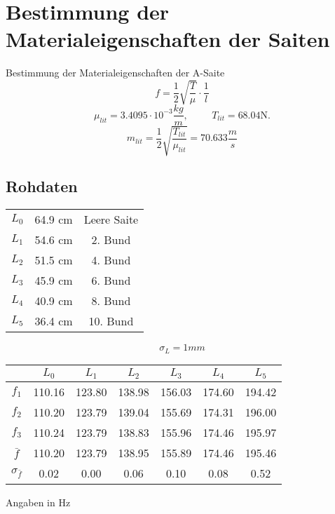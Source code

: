 \documentclass[11pt]{beamer}
\begin{document}
\section{Bestimmung der Materialeigenschaften der Saiten}
\begin{frame}{Bestimmung der Materialeigenschaften der A-Saite}
\begin{equation*}
f=\frac{1}{2}\sqrt{\frac{T}{\mu}}\cdot \frac{1}{l}
\end{equation*}
\begin{equation*}
\mu_{lit}=3.4095 \cdot 10^{-3} \frac{kg}{m}, \hspace{1cm}
T_{lit}=68.04 \text{N.}
\end{equation*}
\begin{equation*}
m_{lit}=\frac{1}{2}\sqrt{\frac{T_{lit}}{\mu_{lit}}}=70.633 \frac{m}{s}
\end{equation*}
\end{frame}

\subsection{Rohdaten}
\begin{frame}
\begin{table}[H]\centering
\begin{tabular}{c|c|c}
$L_0$ & 64.9 cm & Leere Saite\\ 
$L_1$ & 54.6 cm & 2. Bund \\ 
$L_2$ & 51.5 cm & 4. Bund \\ 
$L_3$ & 45.9 cm & 6. Bund \\ 
$L_4$ & 40.9 cm & 8. Bund \\ 
$L_5$ & 36.4 cm & 10. Bund \\ 
\end{tabular} 
\end{table}
\begin{equation*}
\sigma_L=1 mm
\end{equation*}
\begin{table}[H]\centering
\begin{tabular}{c|cccccc}
 & $L_0$ & $L_1$ & $L_2$ & $L_3$ & $L_4$ & $L_5$ \\ 
\hline 
$f_1$ & 110.16 & 123.80 & 138.98 & 156.03 & 174.60 & 194.42 \\ 
$f_2$ & 110.20 & 123.79 & 139.04 & 155.69 & 174.31 & 196.00 \\ 
$f_3$ & 110.24 & 123.79 & 138.83 & 155.96 & 174.46 & 195.97 \\ 
$\bar{f}$ & 110.20 & 123.79 & 138.95 & 155.89 & 174.46 & 195.46 \\ 
$\sigma_{\bar{f}}$ & 0.02 & 0.00 & 0.06  & 0.10 & 0.08  & 0.52  \\ 
\end{tabular}
\newline 
Angaben in Hz
\end{table}
\end{frame}
\end{document}
